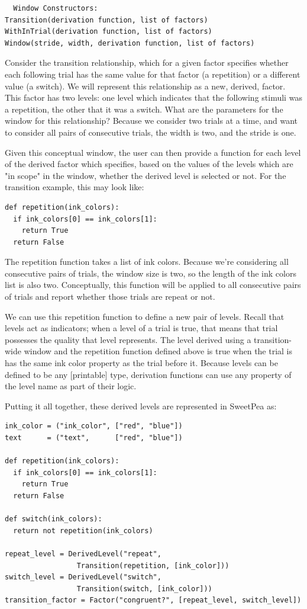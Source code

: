 \begin{verbatim}
  Window Constructors:
Transition(derivation function, list of factors)
WithInTrial(derivation function, list of factors)
Window(stride, width, derivation function, list of factors)
\end{verbatim}

Consider the transition relationship, which for a given factor specifies whether each following trial has the same value for that factor (a repetition) or a different value (a switch). We will represent this relationship as a new, derived, factor. This factor has two levels: one level which indicates that the following stimuli was a repetition, the other that it was a switch. What are the parameters for the window for this relationship? Because we consider two trials at a time, and want to consider all pairs of consecutive trials, the width is two, and the stride is one.

Given this conceptual window, the user can then provide a function for each level of the derived factor which specifies, based on the values of the levels which are "in scope" in the window, whether the derived level is selected or not. For the transition example, this may look like:

\begin{verbatim}
def repetition(ink_colors):
  if ink_colors[0] == ink_colors[1]:
    return True
  return False
\end{verbatim}

The repetition function takes a list of ink colors. Because we're considering all consecutive pairs of trials, the window size is two, so the length of the ink colors list is also two. Conceptually, this function will be applied to all consecutive pairs of trials and report whether those trials are repeat or not.

We can use this repetition function to define a new pair of levels. Recall that levels act as indicators; when a level of a trial is true, that means that trial possesses the quality that level represents. The level derived using a transition-wide window and the repetition function defined above is true when the trial is has the same ink color property as the trial before it. Because levels can be defined to be any [printable] type, derivation functions can use any property of the level name as part of their logic.

Putting it all together, these derived levels are represented in SweetPea as:

\begin{verbatim}
ink_color = ("ink_color", ["red", "blue"])
text      = ("text",      ["red", "blue"])

def repetition(ink_colors):
  if ink_colors[0] == ink_colors[1]:
    return True
  return False

def switch(ink_colors):
  return not repetition(ink_colors)

repeat_level = DerivedLevel("repeat",
                 Transition(repetition, [ink_color]))
switch_level = DerivedLevel("switch",
                 Transition(switch, [ink_color]))
transition_factor = Factor("congruent?", [repeat_level, switch_level])

\end{verbatim}

